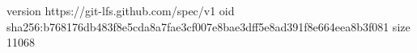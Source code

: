 version https://git-lfs.github.com/spec/v1
oid sha256:b768176db483f8e5cda8a7fae3cf007e8bae3dff5e8ad391f8e664eea8b3f081
size 11068
